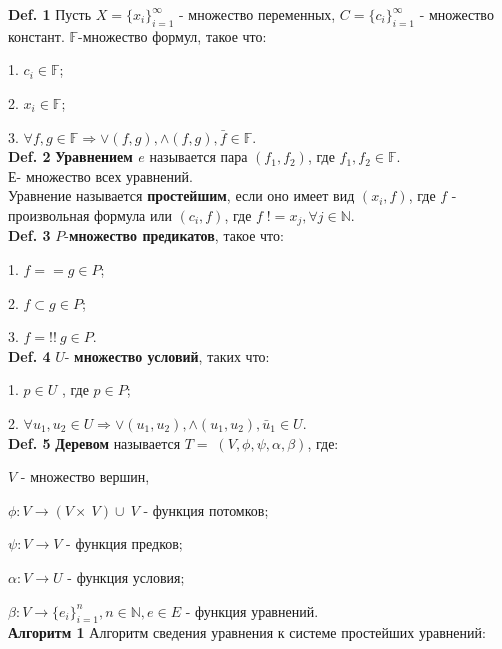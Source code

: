 \documentclass[12pt]{article}
\begin{document}
 
	{\bf Def. 1} Пусть $X = \lbrace  x_{i}  \rbrace_{i=1}^{\infty} $ - множество переменных,
	$C = \lbrace  c_{i}  \rbrace_{i=1}^{\infty} $ - множество констант. $\mathbb{F}$-множество формул, такое что:
	
	1. $c_{i} \in \mathbb{F} $; 
	
	2. $x_{i} \in \mathbb{F} $; 
	
	3. $\forall f, g \in \mathbb{F} \Rightarrow \vee(f,g), \wedge(f,g), \bar f \in \mathbb{F}$.
	\\

	{\bf Def. 2} {\bf Уравнением  $e$} называется пара $(f_{1},f_{2})$, где $f_{1},f_{2} \in \mathbb{F}$.\\Е- множество всех уравнений.
	\\Уравнение называется {\bf простейшим}, если оно имеет вид $(x_{i}, f)$, где $f$ - произвольная формула или $(c_{i}, f)$, где $f \; != x_{j}, \forall j \in \mathbb{N}$.
	\\
	
	{\bf Def. 3} $P$-{\bf множество предикатов}, такое что: 
	
	1. $f==g \in P$; 
	
    2. $f \subset g \in P$;
    
    3. $f =!! \: g \in P$.
    \\
    
    {\bf Def. 4}  $U$- {\bf множество условий}, таких что: 
    
    1. $p \in U$ , где $p \in P$;
    
    2. $\forall u_{1}, u_{2} \in U \Rightarrow \vee(u_{1},u_{2}), \wedge(u_{1},u_{2}), \bar u_{1} \in U$.
    \\
    
     {\bf Def. 5} {\bf Деревом} называется $T = \; (V,\phi,\psi, \alpha, \beta)$, где: 
     
     $V$ - множество вершин,
     
      $\phi : V \rightarrow (V\times \:V)\cup \:V$ - функция потомков;
      
      $\psi : V \rightarrow V$ - функция предков;
      
      $\alpha : V \rightarrow U$ - функция условия;
      
      $\beta : V \rightarrow \lbrace  e_{i}  \rbrace_{i=1}^{n}, n \in \mathbb{N}, e \in E $ - функция уравнений.
     \\
     
     \hypertarget{a1}{{\bf Алгоритм 1}}
     Алгоритм сведения уравнения к системе простейших уравнений:
     
\end{document}
